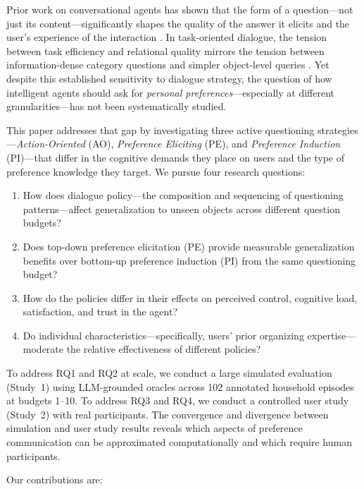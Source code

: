 \documentclass[a4paper,fleqn]{cas-sc}
\begin{document}
Prior work on conversational agents has shown that the form of a question---not just its content---significantly shapes the quality of the answer it elicits and the user's experience of the interaction \citep{jin2024way}. In task-oriented dialogue, the tension between task efficiency and relational quality mirrors the tension between information-dense category questions and simpler object-level queries \citep{haugeland2022understanding}. Yet despite this established sensitivity to dialogue strategy, the question of how intelligent agents should ask for \emph{personal preferences}---especially at different granularities---has not been systematically studied.

This paper addresses that gap by investigating three active questioning strategies---\emph{Action-Oriented} (AO), \emph{Preference Eliciting} (PE), and \emph{Preference Induction} (PI)---that differ in the cognitive demands they place on users and the type of preference knowledge they target. We pursue four research questions:

\begin{enumerate}[label=\textbf{RQ\arabic*:},leftmargin=*]
    \item How does dialogue policy---the composition and sequencing of questioning patterns---affect generalization to unseen objects across different question budgets?
    \item Does top-down preference elicitation (PE) provide measurable generalization benefits over bottom-up preference induction (PI) from the same questioning budget?
    \item How do the policies differ in their effects on perceived control, cognitive load, satisfaction, and trust in the agent?
    \item Do individual characteristics---specifically, users' prior organizing expertise---moderate the relative effectiveness of different policies?
\end{enumerate}

To address RQ1 and RQ2 at scale, we conduct a large simulated evaluation (Study~1) using LLM-grounded oracles across 102 annotated household episodes at budgets 1--10. To address RQ3 and RQ4, we conduct a controlled user study (Study~2) with real participants. The convergence and divergence between simulation and user study results reveals which aspects of preference communication can be approximated computationally and which require human participants.

Our contributions are:
\end{document}
